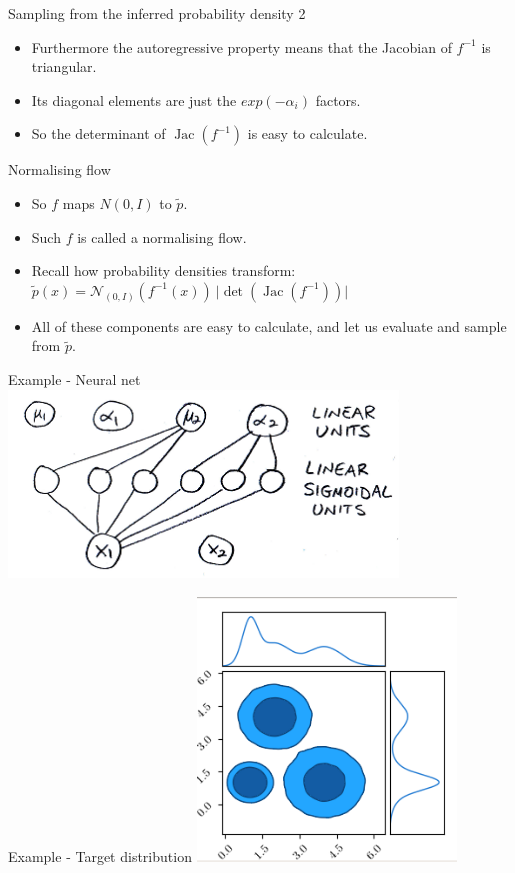 \documentclass[usenames,dvipsnames]{beamer}
\DeclareMathOperator{\jac}{Jac}
\begin{document}
\begin{frame}{Sampling from the inferred probability density 2}
    \begin{itemize}
      \item{Furthermore the autoregressive property means that the Jacobian of $f^{-1}$ is triangular.}
	\item{Its diagonal elements are just the $exp(-\alpha_i)$ factors.}
	\item{So the determinant of $\jac(f^{-1})$ is easy to calculate.}
    \end{itemize}
\end{frame}

\begin{frame}{Normalising flow}
    \begin{itemize}
      \item{So $f$ maps $N(0, I)$ to $\tilde{p}$.}
	\item{Such $f$ is called a normalising flow.}
	\item{Recall how probability densities transform: \\
	$\tilde{p}(x) = \mathcal{N}_{(0, I)}(f^{-1}(x)) \ \lvert \det(\jac(f^{-1})) \rvert$}
	\item{All of these components are easy to calculate, and let us evaluate and sample from $\tilde{p}$.}
    \end{itemize}
\end{frame}

\begin{frame}{Example - Neural net}
     \centering
     \includegraphics[height=5cm]{image_06}
\end{frame}

\begin{frame}{Example - Target distribution}
     \centering
     \includegraphics[height=7cm]{image_07}
\end{frame}
\end{document}
